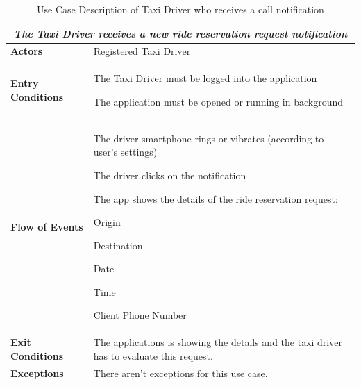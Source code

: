 \documentclass[a4paper]{article}
\begin{document}
\begin{table} [H]
\begin{center}
\begin{tabular}{ |m{}|m{}|  }
\hline
    \multicolumn{2}{|c|}{\textbf{\textit{The Taxi Driver receives a new ride reservation request notification}}} \\
\hline \hline
    \textbf{Actors}
&   Registered Taxi Driver
\\ \hline
    \textbf{Entry Conditions}
&   
    \begin{itemize*}
    \item The Taxi Driver must be logged into the application
    \item The application must be opened or running in background
    \end{itemize*}
\\ \hline
    \textbf{Flow of Events}
& 
    \begin{enumerate*}
    \item The driver smartphone rings or vibrates (according to user's settings)
    \item The driver clicks on the notification
    \item The app shows the details of the ride reservation request:
        \begin{itemize*}
        \item Origin
        \item Destination
        \item Date
        \item Time
        \item Client Phone Number
        \end{itemize*}
    \end{enumerate*}
\\ \hline
    \textbf{Exit Conditions}
&  The applications is showing the details and the taxi driver has to evaluate this request.
\\ \hline
    \textbf{Exceptions}
&   There aren't exceptions for this use case.
\\ \hline
\end{tabular}
\end{center}
\caption{Use Case Description of Taxi Driver who receives a call notification}
\label{table:taxireceiveridereservationnotification}
\end{table}
\end{document}
